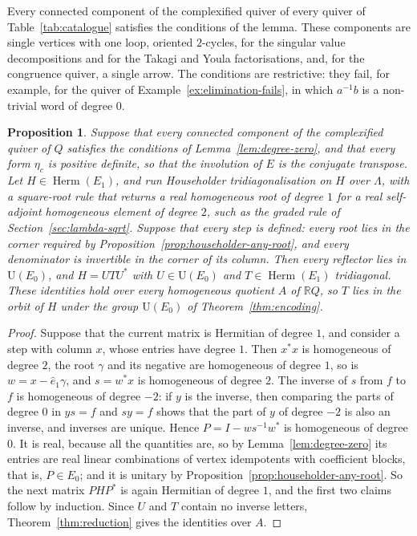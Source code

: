 \documentclass[12pt, a4paper]{report}
\theoremstyle{plain}
\newtheorem{proposition}[theorem]{Proposition}
\theoremstyle{definition}
\theoremstyle{remark}
\theoremstyle{plain}
\newcommand{\RR}{\mathbb{R}}
\newcommand{\Un}{\mathrm{U}}
\newcommand{\Herm}{\operatorname{Herm}}
\begin{document}
Every connected component of the complexified quiver of every quiver of Table~\ref{tab:catalogue} satisfies the conditions of the lemma. These components are single vertices with one loop, oriented $2$-cycles, for the singular value decompositions and for the Takagi and Youla factorisations, and, for the congruence quiver, a single arrow. The conditions are restrictive: they fail, for example, for the quiver of Example~\ref{ex:elimination-fails}, in which $a^{-1}b$ is a non-trivial word of degree $0$.

\begin{proposition}\label{prop:householder-graded}
Suppose that every connected component of the complexified quiver of $Q$ satisfies the conditions of Lemma~\ref{lem:degree-zero}, and that every form $\eta_c$ is positive definite, so that the involution of $E$ is the conjugate transpose. Let $H\in\Herm(E_1)$, and run Householder tridiagonalisation on $H$ over $\Lambda$, with a square-root rule that returns a real homogeneous root of degree $1$ for a real self-adjoint homogeneous element of degree $2$, such as the graded rule of Section~\ref{sec:lambda-sqrt}. Suppose that every step is defined: every root lies in the corner required by Proposition~\ref{prop:householder-any-root}, and every denominator is invertible in the corner of its column. Then every reflector lies in $\Un(E_0)$, and $H=UTU^*$ with $U\in\Un(E_0)$ and $T\in\Herm(E_1)$ tridiagonal. These identities hold over every homogeneous quotient $A$ of $\RR Q$, so $T$ lies in the orbit of $H$ under the group $\Un(E_0)$ of Theorem~\ref{thm:encoding}.
\end{proposition}
\begin{proof}
Suppose that the current matrix is Hermitian of degree $1$, and consider a step with column $x$, whose entries have degree $1$. Then $x^*x$ is homogeneous of degree $2$, the root $\gamma$ and its negative are homogeneous of degree $1$, so is $w=x-\hat e_1\gamma$, and $s=w^*x$ is homogeneous of degree $2$. The inverse of $s$ from $f$ to $f$ is homogeneous of degree $-2$: if $y$ is the inverse, then comparing the parts of degree $0$ in $ys=f$ and $sy=f$ shows that the part of $y$ of degree $-2$ is also an inverse, and inverses are unique. Hence $P=I-ws^{-1}w^*$ is homogeneous of degree $0$. It is real, because all the quantities are, so by Lemma~\ref{lem:degree-zero} its entries are real linear combinations of vertex idempotents with coefficient blocks, that is, $P\in E_0$; and it is unitary by Proposition~\ref{prop:householder-any-root}. So the next matrix $PHP^*$ is again Hermitian of degree $1$, and the first two claims follow by induction. Since $U$ and $T$ contain no inverse letters, Theorem~\ref{thm:reduction} gives the identities over $A$.
\end{proof}
\end{document}
